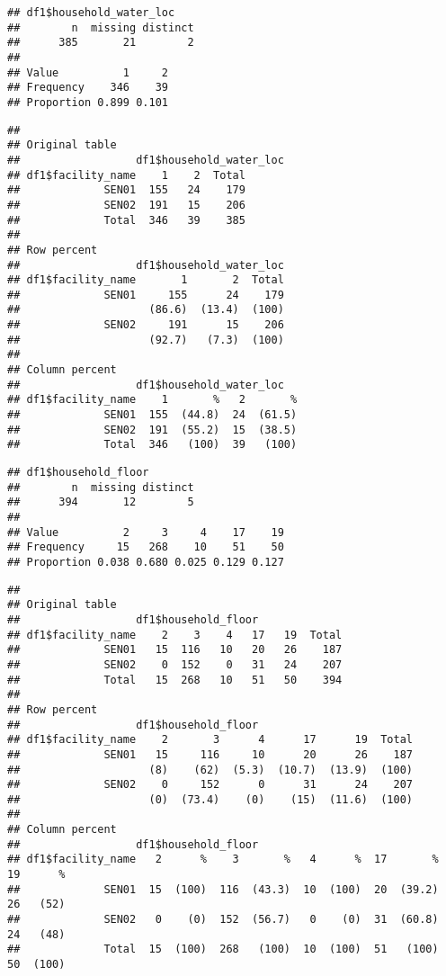 \documentclass[
]{article}
\begin{document}
\begin{verbatim}
## df1$household_water_loc 
##        n  missing distinct 
##      385       21        2 
##                       
## Value          1     2
## Frequency    346    39
## Proportion 0.899 0.101
\end{verbatim}

\begin{verbatim}
## 
## Original table 
##                  df1$household_water_loc
## df1$facility_name    1    2  Total
##             SEN01  155   24    179
##             SEN02  191   15    206
##             Total  346   39    385
## 
## Row percent 
##                  df1$household_water_loc
## df1$facility_name       1       2  Total
##             SEN01     155      24    179
##                    (86.6)  (13.4)  (100)
##             SEN02     191      15    206
##                    (92.7)   (7.3)  (100)
## 
## Column percent 
##                  df1$household_water_loc
## df1$facility_name    1       %   2       %
##             SEN01  155  (44.8)  24  (61.5)
##             SEN02  191  (55.2)  15  (38.5)
##             Total  346   (100)  39   (100)
\end{verbatim}

\begin{verbatim}
## df1$household_floor 
##        n  missing distinct 
##      394       12        5 
##                                         
## Value          2     3     4    17    19
## Frequency     15   268    10    51    50
## Proportion 0.038 0.680 0.025 0.129 0.127
\end{verbatim}

\begin{verbatim}
## 
## Original table 
##                  df1$household_floor
## df1$facility_name    2    3    4   17   19  Total
##             SEN01   15  116   10   20   26    187
##             SEN02    0  152    0   31   24    207
##             Total   15  268   10   51   50    394
## 
## Row percent 
##                  df1$household_floor
## df1$facility_name    2       3      4      17      19  Total
##             SEN01   15     116     10      20      26    187
##                    (8)    (62)  (5.3)  (10.7)  (13.9)  (100)
##             SEN02    0     152      0      31      24    207
##                    (0)  (73.4)    (0)    (15)  (11.6)  (100)
## 
## Column percent 
##                  df1$household_floor
## df1$facility_name   2      %    3       %   4      %  17       %  19      %
##             SEN01  15  (100)  116  (43.3)  10  (100)  20  (39.2)  26   (52)
##             SEN02   0    (0)  152  (56.7)   0    (0)  31  (60.8)  24   (48)
##             Total  15  (100)  268   (100)  10  (100)  51   (100)  50  (100)
\end{verbatim}
\end{document}
